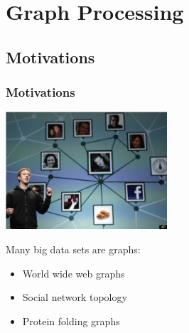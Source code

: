 \section{Graph Processing}
\subsection{Motivations}
\begin{frame}
 \frametitle{Motivations}
\begin{center}
 \includegraphics[keepaspectratio=true,width=0.45\textwidth]{figs/12/fb_opengraph}
\end{center}
\begin{block}{}
 Many big data sets are graphs:
\begin{itemize}
 \item World wide web graphs
 \item Social network topology
 \item Protein folding graphs
\end{itemize}
\end{block}
\end{frame}

